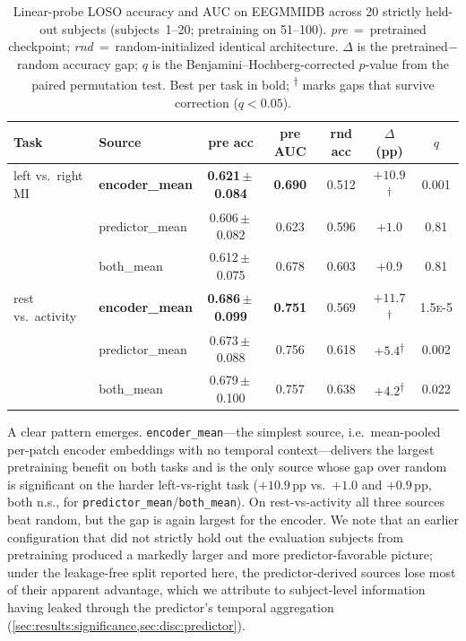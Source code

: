 \begin{table}[t]
\caption{Linear-probe LOSO accuracy and AUC on EEGMMIDB across 20
strictly held-out subjects (subjects~1--20; pretraining on 51--100).
\emph{pre}~=~pretrained checkpoint; \emph{rnd}~=~random-initialized
identical architecture. $\Delta$ is the pretrained$-$random accuracy gap;
$q$ is the Benjamini--Hochberg-corrected $p$-value from the paired
permutation test. Best per task in bold;
\textsuperscript{$\dagger$} marks gaps that survive correction
($q<0.05$).}
\label{tab:headline}
\centering
\small
\begin{tabular}{l l c c c c c}
\toprule
Task & Source & pre acc & pre AUC & rnd acc & $\Delta$ (pp) & $q$ \\
\midrule
left vs.\ right MI    & \textbf{encoder\_mean} & \textbf{0.621\,$\pm$\,0.084} & \textbf{0.690} & 0.512 & $\mathbf{+10.9}$\textsuperscript{$\dagger$} & 0.001 \\
                      & predictor\_mean        & 0.606\,$\pm$\,0.082          & 0.623          & 0.596 & $+1.0$                                       & 0.81  \\
                      & both\_mean             & 0.612\,$\pm$\,0.075          & 0.678          & 0.603 & $+0.9$                                       & 0.81  \\
\midrule
rest vs.\ activity    & \textbf{encoder\_mean} & \textbf{0.686\,$\pm$\,0.099} & \textbf{0.751} & 0.569 & $\mathbf{+11.7}$\textsuperscript{$\dagger$} & 1.5\textsc{e}-5 \\
                      & predictor\_mean        & 0.673\,$\pm$\,0.088          & 0.756          & 0.618 & $+5.4$\textsuperscript{$\dagger$}            & 0.002 \\
                      & both\_mean             & 0.679\,$\pm$\,0.100          & 0.757          & 0.638 & $+4.2$\textsuperscript{$\dagger$}            & 0.022 \\
\bottomrule
\end{tabular}
\end{table}

A clear pattern emerges. \texttt{encoder\_mean}---the simplest source,
i.e.\ mean-pooled per-patch encoder embeddings with no temporal
context---delivers the largest pretraining benefit on both tasks and is
the only source whose gap over random is significant on the harder
left-vs-right task ($+10.9$\,pp vs.\ $+1.0$ and $+0.9$\,pp, both n.s., for
\texttt{predictor\_mean}/\texttt{both\_mean}). On rest-vs-activity all
three sources beat random, but the gap is again largest for the encoder.
We note that an earlier configuration that did not strictly hold out the
evaluation subjects from pretraining produced a markedly larger and more
predictor-favorable picture; under the leakage-free split reported here,
the predictor-derived sources lose most of their apparent advantage,
which we attribute to subject-level information having leaked through the
predictor's temporal aggregation
(\cref{sec:results:significance,sec:disc:predictor}).

